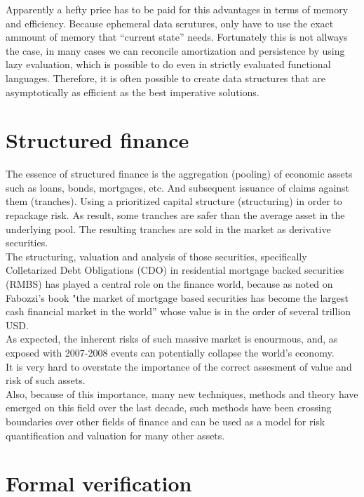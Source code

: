 \documentclass{tufte-book} %
\begin{document}
Apparently a hefty price has to be paid for this advantages in terms of memory and efficiency. Because ephemeral data scrutures, only have to use the exact ammount of memory that ``current state'' needs. Fortunately this is not allways the case, in many cases we can reconcile amortization and persistence by using lazy evaluation, which is possible to do even in strictly evaluated functional languages. Therefore, it is often possible to create data structures that are asymptotically as efficient as the best imperative solutions.

\section{Structured finance}

The essence of structured finance is the aggregation (pooling) of economic assets such as loans, bonds, mortgages, etc. And subsequent issuance of claims against them (tranches). Using a prioritized capital structure (structuring) in order to repackage risk. As result, some tranches are safer than the average asset in the underlying pool. The resulting tranches are sold in the market as derivative securities.\\

The structuring, valuation and analysis of those securities, specifically Colletarized Debt Obligations (CDO) in residential mortgage backed securities (RMBS) has played a central role on the finance world, because as noted on Fabozzi's book \cite{Fabozzi2010} "the market of mortgage based securities has become the largest cash financial market in the world'' whose value is in the order of several trillion USD.\\

As expected, the inherent risks of such massive market is enourmous, and, as exposed with 2007-2008 events can potentially collapse the world's economy.\\
It is very hard to overstate the importance of the correct assesment of value and risk of such assets.\\

Also, because of this importance, many new techniques, methods and theory have emerged on this field over the last decade, such methods have been crossing boundaries over other fields of finance and can be used as a model for risk quantification and valuation for many other assets.\\

\newpage
\section{Formal verification}
\end{document}
